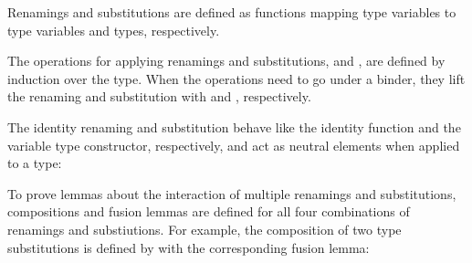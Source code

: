 \documentclass[acmsmall,anonymous,review,screen]{acmart}
\newenvironment{AgdaBlock}{%
  \vspace{\AgdaEmptySkip}%
  \AgdaNoSpaceAroundCode{}%
}{%
  \AgdaSpaceAroundCode{}
}
\begin{document}
Renamings {\ATRen} and substitutions {\ATSub} are defined as
functions mapping type variables to type variables and types, respectively.

\noindent\hspace{-\fboxsep}
\begin{minipage}{0.5\linewidth}
  \SubDefTRen
\end{minipage}
\begin{minipage}{0.5\linewidth}
  \SubDefTSub
\end{minipage}

The operations for applying renamings and substitutions, {\ATren}
and {\ATsub}, are defined by induction over the type. When the
operations need to go under a binder, they lift the renaming and
substitution with {\ATliftR} and {\ATliftS}, respectively.

\noindent\hspace{-\fboxsep}
\begin{minipage}{0.5\linewidth}
  \SubDefTren
\end{minipage}
\begin{minipage}{0.5\linewidth}
  \SubDefTsub
\end{minipage}

The identity renaming {\ATidR} and substitution
{\ATidS} behave like the identity function and the variable
type constructor, respectively, and act as neutral elements when applied to a type:

\noindent\hspace{-\fboxsep}
\begin{minipage}{0.5\linewidth}
  \begin{AgdaBlock}
    \SubDefTidR
    \TFTidRNeutral
  \end{AgdaBlock}
\end{minipage}
\begin{minipage}{0.5\linewidth}
  \begin{AgdaBlock}
    \SubDefTidS
    \TFTidSNeutral
  \end{AgdaBlock}
\end{minipage}



To prove lemmas about the interaction of multiple renamings and substitutions,
compositions and fusion lemmas are defined for all four combinations
of renamings and substiutions.
For example, the composition of two type substitutions is defined by
\SubstExamplesTCompSS
with the corresponding fusion lemma:
\SubstExamplesFusionTSubTSub
\end{document}
